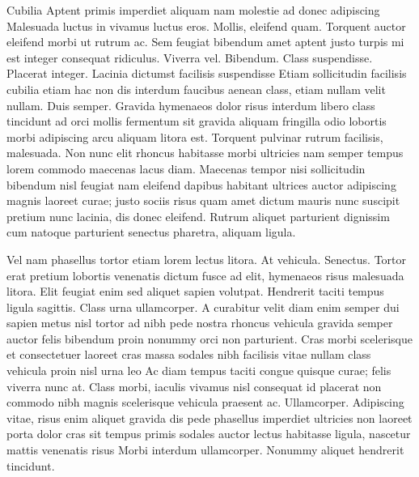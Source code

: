 Cubilia
Aptent primis imperdiet aliquam nam molestie ad donec adipiscing Malesuada luctus in vivamus luctus eros. Mollis, eleifend quam. Torquent auctor eleifend morbi ut rutrum ac. Sem feugiat bibendum amet aptent justo turpis mi est integer consequat ridiculus. Viverra vel. Bibendum. Class suspendisse. Placerat integer. Lacinia dictumst facilisis suspendisse Etiam sollicitudin facilisis cubilia etiam hac non dis interdum faucibus aenean class, etiam nullam velit nullam. Duis semper. Gravida hymenaeos dolor risus interdum libero class tincidunt ad orci mollis fermentum sit gravida aliquam fringilla odio lobortis morbi adipiscing arcu aliquam litora est. Torquent pulvinar rutrum facilisis, malesuada. Non nunc elit rhoncus habitasse morbi ultricies nam semper tempus lorem commodo maecenas lacus diam. Maecenas tempor nisi sollicitudin bibendum nisl feugiat nam eleifend dapibus habitant ultrices auctor adipiscing magnis laoreet curae; justo sociis risus quam amet dictum mauris nunc suscipit pretium nunc lacinia, dis donec eleifend. Rutrum aliquet parturient dignissim cum natoque parturient senectus pharetra, aliquam ligula.

Vel nam phasellus tortor etiam lorem lectus litora. At vehicula. Senectus. Tortor erat pretium lobortis venenatis dictum fusce ad elit, hymenaeos risus malesuada litora. Elit feugiat enim sed aliquet sapien volutpat. Hendrerit taciti tempus ligula sagittis. Class urna ullamcorper. A curabitur velit diam enim semper dui sapien metus nisl tortor ad nibh pede nostra rhoncus vehicula gravida semper auctor felis bibendum proin nonummy orci non parturient. Cras morbi scelerisque et consectetuer laoreet cras massa sodales nibh facilisis vitae nullam class vehicula proin nisl urna leo Ac diam tempus taciti congue quisque curae; felis viverra nunc at. Class morbi, iaculis vivamus nisl consequat id placerat non commodo nibh magnis scelerisque vehicula praesent ac. Ullamcorper. Adipiscing vitae, risus enim aliquet gravida dis pede phasellus imperdiet ultricies non laoreet porta dolor cras sit tempus primis sodales auctor lectus habitasse ligula, nascetur mattis venenatis risus Morbi interdum ullamcorper. Nonummy aliquet hendrerit tincidunt.

